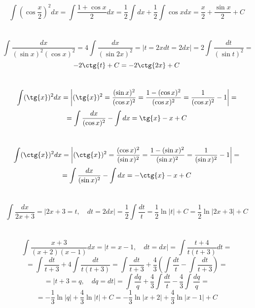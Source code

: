 \section{}
    \[\int \left(\cos{\frac{x}{2}}\right)^2 dx = \int \frac{1 + \cos{x}}{2}dx =
    \frac{1}{2} \int dx + \frac{1}{2} \int \cos{x}dx = \frac{x}{2} +
    \frac{\sin{x}}{2} + C\]

\section{}
    \[\int \frac{dx}{(\sin{x})^2 (\cos{x})^2} = 4 \int \frac{dx}{(\sin{2x})^2}
    = \left| t = 2x dt = 2dx \right| = 2 \int \frac{dt}{(\sin{t})^2} =\]
    \[-2 \ctg{t} + C = -2 \ctg{2x} + C\]    

\section{}
    \[\int (\tg{x})^2 dx = \left| (\tg{x})^2 = \frac{(\sin{x})^2}{(\cos{x})^2}
    = \frac{1 - (\cos{x})^2}{(\cos{x})^2}  = 
    \frac{1}{(\cos{x})^2} - 1\right| = \]
    \[= \int \frac{dx}{(\cos{x})^2} - \int dx = \tg{x} - x + C\]

\section{}
    \[\int (\ctg{x})^2 dx = \left| (\ctg{x})^2 = 
    \frac{(\cos{x})^2}{(\sin{x})^2} = \frac{1 - (\sin{x})^2}{(\sin{x})^2} = 
    \frac{1}{(\sin{x})^2} - 1 \right| = \]
    \[= \int \frac{dx}{(\sin{x})^2} - \int dx = - \ctg{x} - x + C\]
    
\section{}
    \[\int \frac{dx}{2x + 3} = \left| 2x + 3 = t, \quad dt = 2dx \right| =
    \frac{1}{2} \int \frac{dt}{t} = \frac{1}{2} \ln{|t|} + C =
    \frac{1}{2} \ln|2x + 3| + C\]
    
\section{}
    \[\int \frac{x + 3}{(x + 2)(x - 1)}dx = \left| t = x - 1, \quad dt = dx
    \right| = \int \frac{t + 4}{t(t + 3)}dt =\]
    \[= \int \frac{dt}{t + 3} + 4 \int \frac{dt}{t(t + 3)} = 
    \int \frac{dt}{t + 3} + \frac{4}{3}(\int \frac{dt}{t} - \int \frac{dt}{t + 3}) =\]
    \[= \left|t + 3 = q, \quad dq = dt \right| = \int \frac{dq}{q} +
    \frac{4}{3} \int \frac{dt}{t} - \frac{4}{3} \int \frac{dq}{q} =\]
    \[= -\frac{1}{3} \ln{|q|} + \frac{4}{3} \ln{|t|} + C =
    -\frac{1}{3} \ln{|x + 2|} + \frac{4}{3} \ln{|x - 1|} + C\]
    
